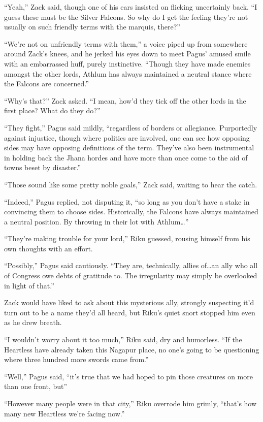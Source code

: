 ``Yeah,'' Zack said, though one of his ears insisted on flicking uncertainly back. ``I guess these must be the Silver Falcons. So why do I get the feeling they're not usually on such friendly terms with the marquis, there?''

``We're not on unfriendly terms with them,'' a voice piped up from somewhere around Zack's knees, and he jerked his eyes down to meet Pagus' amused smile with an embarrassed huff, purely instinctive. ``Though they have made enemies amongst the other lords, Athlum has always maintained a neutral stance where the Falcons are concerned.''

``Why's that?'' Zack asked. ``I mean, how'd they tick off the other lords in the first place? What do they do?''

``They fight,'' Pagus said mildly, ``regardless of borders or allegiance. Purportedly against injustice, though where politics are involved, one can see how opposing sides may have opposing definitions of the term. They've also been instrumental in holding back the Jhana hordes and have more than once come to the aid of towns beset by disaster.''

``Those sound like some pretty noble goals,'' Zack said, waiting to hear the catch.

``Indeed,'' Pagus replied, not disputing it, ``so long as you don't have a stake in convincing them to choose sides. Historically, the Falcons have always maintained a neutral position. By throwing in their lot with Athlum\ldots''

``They're making trouble for your lord,'' Riku guessed, rousing himself from his own thoughts with an effort.

``Possibly,'' Pagus said cautiously. ``They are, technically, allies of\ldots an ally who all of Congress owe debts of gratitude to. The irregularity may simply be overlooked in light of that.''

Zack would have liked to ask about this mysterious ally, strongly suspecting it'd turn out to be a name they'd all heard, but Riku's quiet snort stopped him even as he drew breath.

``I wouldn't worry about it too much,'' Riku said, dry and humorless. ``If the Heartless have already taken this Nagapur place, no one's going to be questioning where three hundred more swords came from.''

``Well,'' Pagus said, ``it's true that we had hoped to pin those creatures on more than one front, but\textemdash''

``However many people were in that city,'' Riku overrode him grimly, ``that's how many new Heartless we're facing now.''

